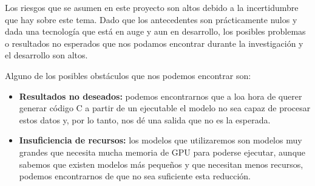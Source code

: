 
Los riesgos que se asumen en este proyecto son altos debido a la incertidumbre que hay
sobre este tema. Dado que los antecedentes son prácticamente nulos y dada una tecnología
que está en auge y aun en desarrollo, los posibles problemas o resultados no esperados
que nos podamos encontrar durante la investigación y el desarrollo son altos.

Alguno de los posibles obstáculos que nos podemos encontrar son:

\begin{itemize}
    \item \textbf{Resultados no deseados:} podemos encontrarnos que a loa hora de querer
        generar código C a partir de un ejecutable el modelo no sea capaz de procesar estos datos
        y, por lo tanto, nos dé una salida que no es la esperada.
    \item \textbf{Insuficiencia de recursos:} los modelos que utilizaremos son modelos
        muy grandes que necesita mucha memoria de GPU para poderse ejecutar, aunque sabemos que
        existen modelos más pequeños y que necesitan menos recursos, podemos encontrarnos de
        que no sea suficiente esta reducción.
\end{itemize}